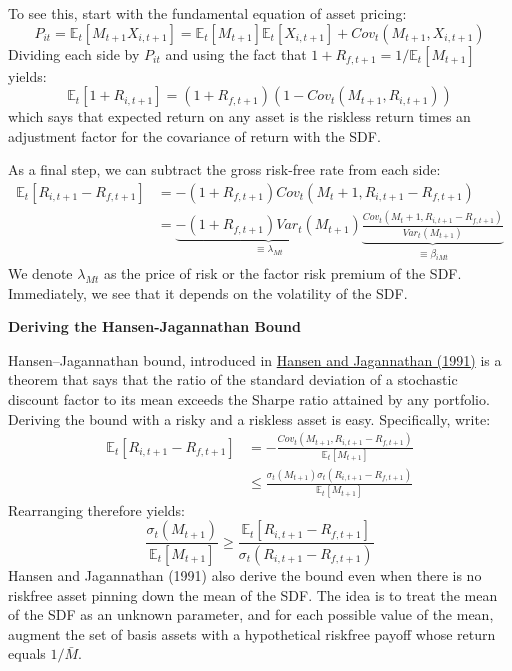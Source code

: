 \documentclass[
]{book}
\begin{document}
To see this, start with the fundamental equation of asset pricing:
\[
P_{it} = \mathbb{E}_t[M_{t+1}X_{i,t+1}] = \mathbb{E}_t[M_{t+1}]\mathbb{E}_t[X_{i,t+1}] + Cov_t(M_{t+1}, X_{i,t+1})
\]
Dividing each side by \(P_{it}\) and using the fact that \(1+R_{f,t+1} = 1 / \mathbb{E}_t[M_{t+1}]\) yields:
\[
\mathbb{E}_t[1+R_{i,t+1}] = (1 + R_{f,t+1})(1 - Cov_t(M_{t+1}, R_{i,t+1}))
\]
which says that expected return on any asset is the riskless return times an adjustment factor for the covariance of return with the SDF.

As a final step, we can subtract the gross risk-free rate from each side:
\[
\begin{aligned}
\mathbb{E}_t[R_{i,t+1} - R_{f,t+1}] &= -(1+R_{f,t+1}) Cov_t(M_t+1, R_{i,t+1} - R_{f,t+1})\\
                                    &= \underbrace{-(1+R_{f,t+1})Var_t(M_{t+1})}_{\equiv \lambda_{Mt}}\underbrace{\frac{Cov_t(M_t+1, R_{i,t+1} - R_{f,t+1})}{Var_t(M_{t+1})}}_{\equiv \beta_{iMt}}
\end{aligned}
\]
We denote \(\lambda_{Mt}\) as the price of risk or the factor risk premium of the SDF. Immediately, we see that it depends on the volatility of the SDF.

\textbf{Deriving the Hansen-Jagannathan Bound}

Hansen--Jagannathan bound, introduced in \protect\hyperlink{HansJaga:91}{Hansen and Jagannathan (1991)} is a theorem that says that the ratio of the standard deviation of a stochastic discount factor to its mean exceeds the Sharpe ratio attained by any portfolio. Deriving the bound with a risky and a riskless asset is easy. Specifically, write:
\[
\begin{aligned}
\mathbb{E}_t[R_{i,t+1} - R_{f,t+1}] &= -\frac{Cov_t(M_{t+1}, R_{i,t+1} - R_{f,t+1})}{\mathbb{E}_t[M_{t+1}]}\\
                                    &\leq \frac{\sigma_t(M_{t+1})\sigma_t(R_{i,t+1} - R_{f,t+1})}{\mathbb{E}_t[M_{t+1}]}
\end{aligned}
\]
Rearranging therefore yields:
\[
\frac{\sigma_t(M_{t+1})}{\mathbb{E}_t[M_{t+1}]} \geq \frac{\mathbb{E}_t[R_{i,t+1} - R_{f,t+1}]}{\sigma_t(R_{i,t+1} - R_{f,t+1})}
\]
Hansen and Jagannathan (1991) also derive the bound even when there is no riskfree asset pinning down the mean of the SDF. The idea is to treat the mean of the SDF as an unknown parameter, and for each possible value of the mean, augment the set of basis assets with a hypothetical riskfree payoff whose return equals \(1/\bar{M}\).
\end{document}
